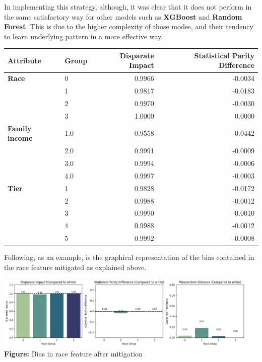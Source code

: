 \documentclass{article}
\begin{document}
In implementing this strategy, although, it was clear that it does not perform in the same satisfactory way for other models such as \textbf{XGBoost} and \textbf{Random Forest}. This is due to the higher complexity of those modes, and their tendency to learn underlying pattern in a more effective way.

\begin{center}
\begin{tabular}{llrr} 
\toprule
\textbf{Attribute} & \textbf{Group} & \textbf{Disparate Impact} & \textbf{Statistical Parity Difference} \\
\midrule
\textbf{Race}
& 0 & 0.9966 & -0.0034 \\
& 1 & 0.9817 & -0.0183 \\
& 2 & 0.9970 & -0.0030 \\
& 3 & 1.0000 & 0.0000 \\
\midrule
\textbf{Family income}
& 1.0 & 0.9558 & -0.0442 \\
& 2.0 & 0.9991 & -0.0009 \\
& 3.0 & 0.9994 & -0.0006 \\
& 4.0 & 0.9997 & -0.0003 \\
\midrule
\textbf{Tier}
& 1 & 0.9828 & -0.0172 \\
& 2 & 0.9988 & -0.0012 \\
& 3 & 0.9990 & -0.0010 \\
& 4 & 0.9988 & -0.0012 \\
& 5 & 0.9992 & -0.0008 \\
\bottomrule
\end{tabular}
\end{center}
    

Following, as an example, is the graphical representation of the bias contained in the race feature mitigated as explained above. 
\noindent
\begin{center}
  \includegraphics[width=0.95\textwidth]{raceexamplegood.png}
  \vspace{0.7em}
  \textbf{Figure:} Bias in race feature after mitigation
\end{center}
\end{document}
